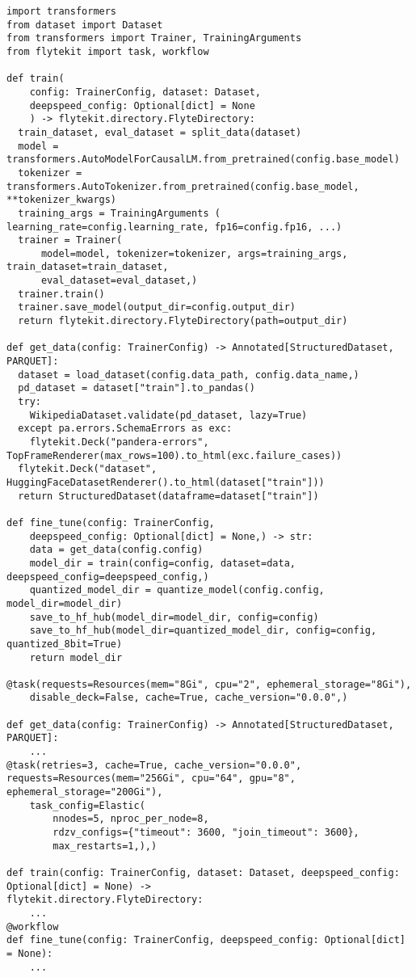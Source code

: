 
\begin{verbatim}
import transformers
from dataset import Dataset
from transformers import Trainer, TrainingArguments
from flytekit import task, workflow

def train(
    config: TrainerConfig, dataset: Dataset, 
    deepspeed_config: Optional[dict] = None
    ) -> flytekit.directory.FlyteDirectory:  
  train_dataset, eval_dataset = split_data(dataset)
  model = transformers.AutoModelForCausalLM.from_pretrained(config.base_model)  
  tokenizer = transformers.AutoTokenizer.from_pretrained(config.base_model, **tokenizer_kwargs)
  training_args = TrainingArguments ( learning_rate=config.learning_rate, fp16=config.fp16, ...)
  trainer = Trainer(
      model=model, tokenizer=tokenizer, args=training_args, train_dataset=train_dataset,
      eval_dataset=eval_dataset,)
  trainer.train()
  trainer.save_model(output_dir=config.output_dir)
  return flytekit.directory.FlyteDirectory(path=output_dir)

def get_data(config: TrainerConfig) -> Annotated[StructuredDataset, PARQUET]:
  dataset = load_dataset(config.data_path, config.data_name,)
  pd_dataset = dataset["train"].to_pandas()
  try:
    WikipediaDataset.validate(pd_dataset, lazy=True)
  except pa.errors.SchemaErrors as exc:
    flytekit.Deck("pandera-errors", TopFrameRenderer(max_rows=100).to_html(exc.failure_cases))
  flytekit.Deck("dataset", HuggingFaceDatasetRenderer().to_html(dataset["train"]))
  return StructuredDataset(dataframe=dataset["train"])

def fine_tune(config: TrainerConfig,
    deepspeed_config: Optional[dict] = None,) -> str:
    data = get_data(config.config)
    model_dir = train(config=config, dataset=data, deepspeed_config=deepspeed_config,)
    quantized_model_dir = quantize_model(config.config, model_dir=model_dir)
    save_to_hf_hub(model_dir=model_dir, config=config)
    save_to_hf_hub(model_dir=quantized_model_dir, config=config, quantized_8bit=True)
    return model_dir
    
@task(requests=Resources(mem="8Gi", cpu="2", ephemeral_storage="8Gi"),
    disable_deck=False, cache=True, cache_version="0.0.0",)
    
def get_data(config: TrainerConfig) -> Annotated[StructuredDataset, PARQUET]:
    ...
@task(retries=3, cache=True, cache_version="0.0.0", 
requests=Resources(mem="256Gi", cpu="64", gpu="8", ephemeral_storage="200Gi"),
    task_config=Elastic(
        nnodes=5, nproc_per_node=8,
        rdzv_configs={"timeout": 3600, "join_timeout": 3600},
        max_restarts=1,),)
        
def train(config: TrainerConfig, dataset: Dataset, deepspeed_config: Optional[dict] = None) ->
flytekit.directory.FlyteDirectory:
    ...
@workflow
def fine_tune(config: TrainerConfig, deepspeed_config: Optional[dict] = None):
    ...
\end{verbatim}
